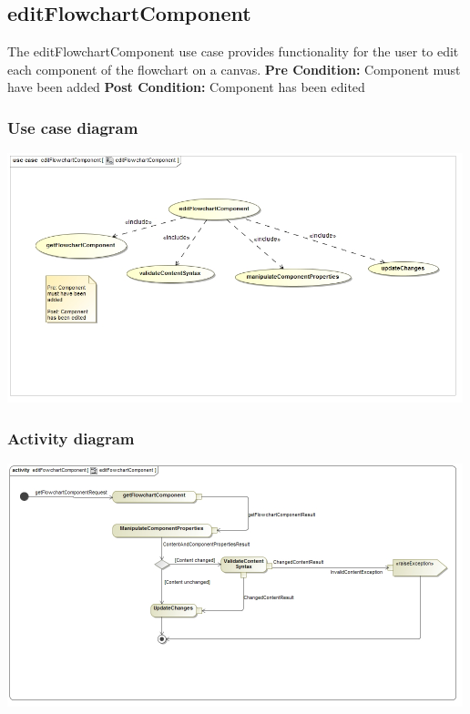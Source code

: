 \documentclass[11pt,a4paper,titlepage]{article}
\begin{document}
\subsection{editFlowchartComponent}
The editFlowchartComponent use case provides functionality for the user to edit each component of the flowchart on a canvas.\newline\newline
\textbf{Pre Condition:} Component must have been added\newline\newline
\textbf{Post Condition:} Component has been edited

\subsubsection{Use case diagram}
\includegraphics[width=500px]{editFlowchartComponentUseCase.jpg}

\subsubsection{Activity diagram}
\includegraphics[width=500px]{editFowchartComponent.jpg}
\end{document}
